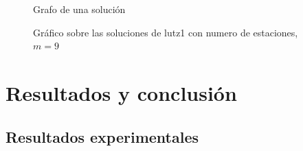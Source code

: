 \documentclass[12pt,a4paper]{report}
\begin{document}
    \begin{figure}[H]
    \centering
    \begin{minipage}{0.48\textwidth}
    \centering
    \caption{Grafo de una solución}
    \label{fig:figura1}
    \end{minipage}\hfill
    \begin{minipage}{0.48\textwidth}
        \centering
        \caption{Gráfico sobre las soluciones de lutz1 con numero de estaciones, $m=9$}
        \label{fig:figura2}
    \end{minipage}
\end{figure}
\chapter{Resultados y conclusión}
\section{Resultados experimentales}
\end{document}
